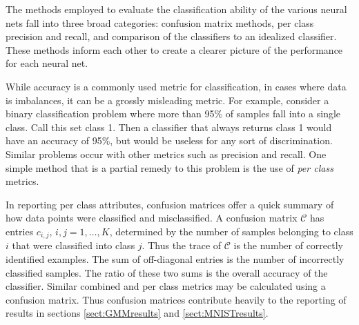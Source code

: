 
\label{sect:eval}
The methods employed to evaluate the classification ability of the various neural nets fall into three broad categories: confusion matrix methods, per class precision and recall, and comparison of the classifiers to an idealized classifier.  These methods inform each other to create a clearer picture of the performance for each neural net.

While accuracy is a commonly used metric for classification, in cases where data is imbalances, it can be a grossly misleading metric. For example, consider a binary classification problem where more than 95\% of samples fall into a single class. Call this set class 1.  Then a classifier that always returns class 1 would have an accuracy of 95\%, but would be useless for any sort of discrimination. Similar problems occur with other metrics such as precision and recall. One simple method that is a partial remedy to this problem is the use of \textit{per class} metrics.

In reporting per class attributes, confusion matrices offer a quick summary of how data points were classified and misclassified. A confusion matrix \( \mathcal{C} \) has entries \(c_{i,j}\), \( i,j=1,\ldots,K \), determined by the number of samples belonging to class \( i \) that were classified into class \( j \).  Thus the trace of \( \mathcal{C} \) is the number of correctly identified examples. The sum of off-diagonal entries is the number of incorrectly classified samples. The ratio of these two sums is the overall accuracy of the classifier. Similar combined and per class metrics may be calculated using a confusion matrix.  Thus confusion matrices contribute heavily to the reporting of results in sections \ref{sect:GMMresults} and \ref{sect:MNISTresults}.

